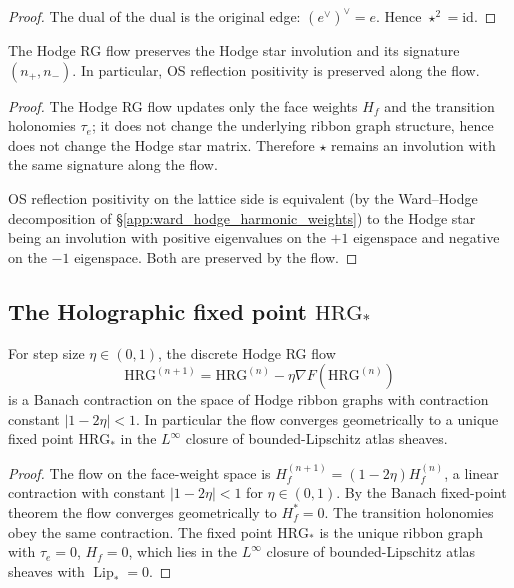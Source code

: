 \begin{proof}
The dual of the dual is the original edge: $(e^{\vee})^{\vee}=e$. Hence
$\star^{2}=\mathrm{id}$.
\end{proof}

\begin{theorem}
\label{thm:os_preservation}
The Hodge RG flow preserves the Hodge star involution and its
signature $(n_{+},n_{-})$. In particular, OS reflection positivity is
preserved along the flow.
\end{theorem}

\begin{proof}
The Hodge RG flow updates only the face weights $H_{f}$ and the
transition holonomies $\tau_{e}$; it does not change the underlying
ribbon graph structure, hence does not change the Hodge star matrix.
Therefore $\star$ remains an involution with the same signature along
the flow.

OS reflection positivity on the lattice side is equivalent (by the
Ward--Hodge decomposition of \S\ref{app:ward_hodge_harmonic_weights})
to the Hodge star being an involution with positive eigenvalues on the
$+1$ eigenspace and negative on the $-1$ eigenspace. Both are
preserved by the flow.
\end{proof}

\subsection{The Holographic fixed point $\mathrm{HRG}_{*}$}
\label{ssec:fixed_point}

\begin{theorem}
\label{thm:fixed_point}
For step size $\eta\in(0,1)$, the discrete Hodge RG flow
\[
\mathrm{HRG}^{(n+1)}=\mathrm{HRG}^{(n)}-\eta\nabla F(\mathrm{HRG}^{(n)})
\]
is a Banach contraction on the space of Hodge ribbon graphs with
contraction constant $|1-2\eta|<1$. In particular the flow converges
geometrically to a unique fixed point $\mathrm{HRG}_{*}$ in the
$L^{\infty}$ closure of bounded-Lipschitz atlas sheaves.
\end{theorem}

\begin{proof}
The flow on the face-weight space is
$H_{f}^{(n+1)}=(1-2\eta)H_{f}^{(n)}$, a linear contraction with
constant $|1-2\eta|<1$ for $\eta\in(0,1)$. By the Banach fixed-point
theorem the flow converges geometrically to $H_{f}^{*}=0$. The
transition holonomies obey the same contraction. The fixed point
$\mathrm{HRG}_{*}$ is the unique ribbon graph with
$\tau_{e}=0$, $H_{f}=0$, which lies in the $L^{\infty}$ closure of
bounded-Lipschitz atlas sheaves with $\operatorname{Lip}_{*}=0$.
\end{proof}

